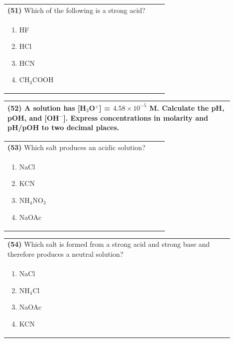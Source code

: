 \documentclass{article}
\begin{document}
\noindent\begin{tabular}{|p{0.9\linewidth}|}
\hline
\textbf{(51)} Which of the following is a strong acid? \\[0.2cm]
\begin{minipage}[t]{0.85\linewidth}
\begin{enumerate}[label=\alph*.]
\item HF \item HCl \item HCN \item CH$_3$COOH
\end{enumerate}
\end{minipage}\\[0.2cm]
\hline
\end{tabular}

\noindent\begin{tabular}{|p{0.9\linewidth}|}
\hline
\textbf{(52)} A solution has [H$_3$O$^+$] = $4.58\times10^{-5}$ M. Calculate the pH, pOH, and [OH$^-$]. Express concentrations in molarity and pH/pOH to two decimal places. \\[4cm]
\hline
\end{tabular}
\newpage

\noindent\begin{tabular}{|p{0.9\linewidth}|}
\hline
\textbf{(53)} Which salt produces an acidic solution? \\[0.2cm]
\begin{minipage}{0.85\linewidth}
\begin{enumerate}[label=\alph*.]
\item NaCl \item KCN \item NH$_4$NO$_3$ \item NaOAc
\end{enumerate}
\end{minipage}\\[0.2cm]
\hline
\end{tabular}

\noindent\begin{tabular}{|p{0.9\linewidth}|}
\hline
\textbf{(54)} Which salt is formed from a strong acid and strong base and therefore produces a neutral solution? \\[0.2cm]
\begin{minipage}{0.85\linewidth}
\begin{enumerate}[label=\alph*.]
\item NaCl \item NH$_4$Cl \item NaOAc \item KCN
\end{enumerate}
\end{minipage}\\[0.2cm]
\hline
\end{tabular}
\end{document}

